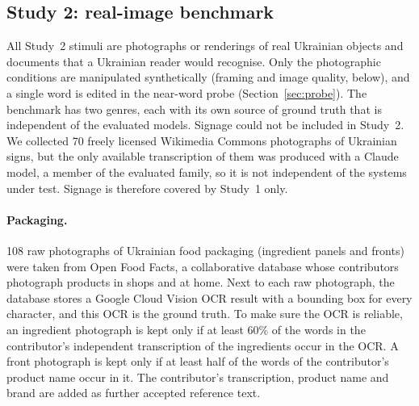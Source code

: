 \documentclass[pdflatex,sn-mathphys-num]{sn-jnl}%
\theoremstyle{thmstyleone}%
\theoremstyle{thmstyletwo}%
\theoremstyle{thmstylethree}%
\newcommand{\NPack}{108}
\begin{document}
\subsection{Study 2: real-image benchmark}\label{sec:stimuli}

All Study~2 stimuli are photographs or renderings of real Ukrainian objects and documents that a Ukrainian reader would recognise. Only the photographic conditions are manipulated synthetically (framing and image quality, below), and a single word is edited in the near-word probe (Section~\ref{sec:probe}). The benchmark has two genres, each with its own source of ground truth that is independent of the evaluated models. Signage could not be included in Study~2. We collected 70 freely licensed Wikimedia Commons photographs of Ukrainian signs, but the only available transcription of them was produced with a Claude model, a member of the evaluated family, so it is not independent of the systems under test. Signage is therefore covered by Study~1 only.

\paragraph{Packaging.} \NPack{} raw photographs of Ukrainian food packaging (ingredient panels and fronts) were taken from Open Food Facts, a collaborative database whose contributors photograph products in shops and at home. Next to each raw photograph, the database stores a Google Cloud Vision OCR result with a bounding box for every character, and this OCR is the ground truth. To make sure the OCR is reliable, an ingredient photograph is kept only if at least 60\% of the words in the contributor's independent transcription of the ingredients occur in the OCR. A front photograph is kept only if at least half of the words of the contributor's product name occur in it. The contributor's transcription, product name and brand are added as further accepted reference text.
\end{document}
